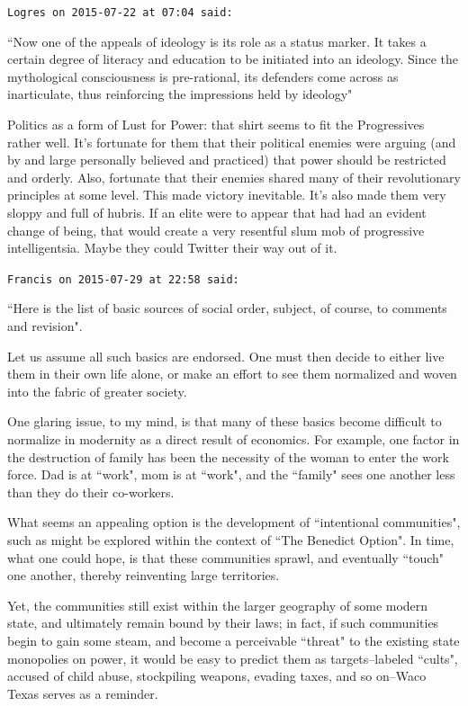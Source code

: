 \begin{footnotesize}\begin{sffamily}



\texttt{Logres on 2015-07-22 at 07:04 said: }

``Now one of the appeals of ideology is its role as a status marker. It takes a certain degree of literacy and education to be initiated into an ideology. Since the mythological consciousness is pre-rational, its defenders come across as inarticulate, thus reinforcing the impressions held by ideology"

Politics as a form of Lust for Power: that shirt seems to fit the Progressives rather well. It's fortunate for them that their political enemies were arguing (and by and large personally believed and practiced) that power should be restricted and orderly. Also, fortunate that their enemies shared many of their revolutionary principles at some level. This made victory inevitable. It's also made them very sloppy and full of hubris. If an elite were to appear that had had an evident change of being, that would create a very resentful slum mob of progressive intelligentsia. Maybe they could Twitter their way out of it.


\hfill

\texttt{Francis on 2015-07-29 at 22:58 said: }

``Here is the list of basic sources of social order, subject, of course, to comments and revision".

Let us assume all such basics are endorsed. One must then decide to either live them in their own life alone, or make an effort to see them normalized and woven into the fabric of greater society. 

One glaring issue, to my mind, is that many of these basics become difficult to normalize in modernity as a direct result of economics. For example, one factor in the destruction of family has been the necessity of the woman to enter the work force. Dad is at ``work", mom is at ``work", and the ``family" sees one another less than they do their co-workers.

What seems an appealing option is the development of ``intentional communities", such as might be explored within the context of ``The Benedict Option". In time, what one could hope, is that these communities sprawl, and eventually ``touch" one another, thereby reinventing large territories. 

Yet, the communities still exist within the larger geography of some modern state, and ultimately remain bound by their laws; in fact, if such communities begin to gain some steam, and become a perceivable ``threat" to the existing state monopolies on power, it would be easy to predict them as targets–labeled ``cults", accused of child abuse, stockpiling weapons, evading taxes, and so on–Waco Texas serves as a reminder.


\end{sffamily}
\end{footnotesize}
